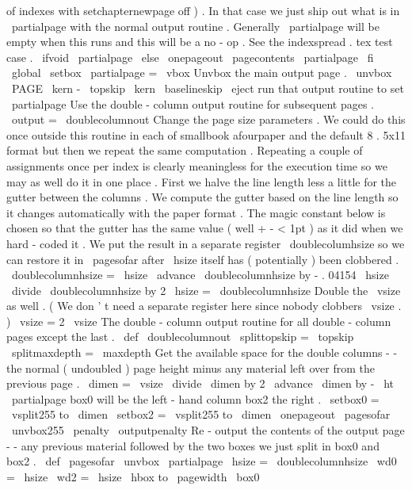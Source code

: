 {{{{{{of
indexes
with
setchapternewpage
off
)
.
In
%
that
case
we
just
ship
out
what
is
in
\
partialpage
with
the
normal
%
output
routine
.
Generally
\
partialpage
will
be
empty
when
this
%
runs
and
this
will
be
a
no
-
op
.
See
the
indexspread
.
tex
test
case
.
\
ifvoid
\
partialpage
\
else
\
onepageout
{
\
pagecontents
\
partialpage
}
%
\
fi
%
\
global
\
setbox
\
partialpage
=
\
vbox
{
%
%
Unvbox
the
main
output
page
.
\
unvbox
\
PAGE
\
kern
-
\
topskip
\
kern
\
baselineskip
}
%
}
%
\
eject
%
run
that
output
routine
to
set
\
partialpage
%
%
Use
the
double
-
column
output
routine
for
subsequent
pages
.
\
output
=
{
\
doublecolumnout
}
%
%
%
Change
the
page
size
parameters
.
We
could
do
this
once
outside
this
%
routine
in
each
of
smallbook
afourpaper
and
the
default
8
.
5x11
%
format
but
then
we
repeat
the
same
computation
.
Repeating
a
couple
%
of
assignments
once
per
index
is
clearly
meaningless
for
the
%
execution
time
so
we
may
as
well
do
it
in
one
place
.
%
%
First
we
halve
the
line
length
less
a
little
for
the
gutter
between
%
the
columns
.
We
compute
the
gutter
based
on
the
line
length
so
it
%
changes
automatically
with
the
paper
format
.
The
magic
constant
%
below
is
chosen
so
that
the
gutter
has
the
same
value
(
well
+
-
<
1pt
)
%
as
it
did
when
we
hard
-
coded
it
.
%
%
We
put
the
result
in
a
separate
register
\
doublecolumhsize
so
we
%
can
restore
it
in
\
pagesofar
after
\
hsize
itself
has
(
potentially
)
%
been
clobbered
.
%
\
doublecolumnhsize
=
\
hsize
\
advance
\
doublecolumnhsize
by
-
.
04154
\
hsize
\
divide
\
doublecolumnhsize
by
2
\
hsize
=
\
doublecolumnhsize
%
%
Double
the
\
vsize
as
well
.
(
We
don
'
t
need
a
separate
register
here
%
since
nobody
clobbers
\
vsize
.
)
\
vsize
=
2
\
vsize
}
%
The
double
-
column
output
routine
for
all
double
-
column
pages
except
%
the
last
.
%
\
def
\
doublecolumnout
{
%
\
splittopskip
=
\
topskip
\
splitmaxdepth
=
\
maxdepth
%
Get
the
available
space
for
the
double
columns
-
-
the
normal
%
(
undoubled
)
page
height
minus
any
material
left
over
from
the
%
previous
page
.
\
dimen
=
\
vsize
\
divide
\
dimen
by
2
\
advance
\
dimen
by
-
\
ht
\
partialpage
%
%
box0
will
be
the
left
-
hand
column
box2
the
right
.
\
setbox0
=
\
vsplit255
to
\
dimen
\
setbox2
=
\
vsplit255
to
\
dimen
\
onepageout
\
pagesofar
\
unvbox255
\
penalty
\
outputpenalty
}
%
%
Re
-
output
the
contents
of
the
output
page
-
-
any
previous
material
%
followed
by
the
two
boxes
we
just
split
in
box0
and
box2
.
\
def
\
pagesofar
{
%
\
unvbox
\
partialpage
%
\
hsize
=
\
doublecolumnhsize
\
wd0
=
\
hsize
\
wd2
=
\
hsize
\
hbox
to
\
pagewidth
{
\
box0
}}}}}}
